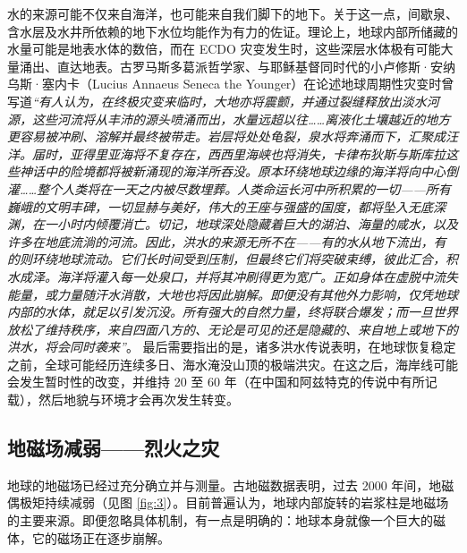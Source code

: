\documentclass[10pt,twocolumn,letterpaper]{article}
\begin{document}
水的来源可能不仅来自海洋，也可能来自我们脚下的地下。关于这一点，间歇泉、含水层及水井所依赖的地下水位均能作为有力的佐证。理论上，地球内部所储藏的水量可能是地表水体的数倍\cite{4}，而在 ECDO 灾变发生时，这些深层水体极有可能大量涌出、直达地表。古罗马斯多葛派哲学家、与耶稣基督\cite{7}同时代的小卢修斯·安纳乌斯·塞内卡（Lucius Annaeus Seneca the Younger）在论述地球周期性灾变时曾写道\textit{“有人认为，在终极灾变来临时，大地亦将震颤，并通过裂缝释放出淡水河源，这些河流将从丰沛的源头喷涌而出，水量远超以往……离液化土壤越近的地方更容易被冲刷、溶解并最终被带走。岩层将处处龟裂，泉水将奔涌而下，汇聚成汪洋。届时，亚得里亚海将不复存在，西西里海峡也将消失，卡律布狄斯与斯库拉这些神话中的险境都将被新涌现的海洋所吞没。原本环绕地球边缘的海洋将向中心倒灌……整个人类将在一天之内被尽数埋葬。人类命运长河中所积累的一切——所有巍峨的文明丰碑，一切显赫与美好，伟大的王座与强盛的国度，都将坠入无底深渊，在一小时内倾覆消亡。切记，地球深处隐藏着巨大的湖泊、海量的咸水，以及许多在地底流淌的河流。因此，洪水的来源无所不在——有的水从地下流出，有的则环绕地球流动。它们长时间受到压制，但最终它们将突破束缚，彼此汇合，积水成泽。海洋将灌入每一处泉口，并将其冲刷得更为宽广。正如身体在虚脱中流失能量，或力量随汗水消散，大地也将因此崩解。即便没有其他外力影响，仅凭地球内部的水体，就足以引发沉没。所有强大的自然力量，终将联合爆发；而一旦世界放松了维持秩序，来自四面八方的、无论是可见的还是隐藏的、来自地上或地下的洪水，将会同时袭来”}。 \cite{8}
最后需要指出的是，诸多洪水传说表明，在地球恢复稳定之前，全球可能经历连续多日、海水淹没山顶的极端洪灾。在这之后，海岸线可能会发生暂时性的改变，并维持 20 至 60 年（在中国和阿兹特克的传说中有所记载）\cite{5,6}，然后地貌与环境才会再次发生转变。

\subsection{地磁场减弱——烈火之灾}
地球的地磁场已经过充分确立并与测量。古地磁数据表明，过去 2000 年间，地磁偶极矩持续减弱\cite{9}（见图 \ref{fig:3}）。目前普遍认为，地球内部旋转的岩浆柱是地磁场的主要来源。即便忽略具体机制，有一点是明确的：地球本身就像一个巨大的磁体，它的磁场正在逐步崩解。
\end{document}
